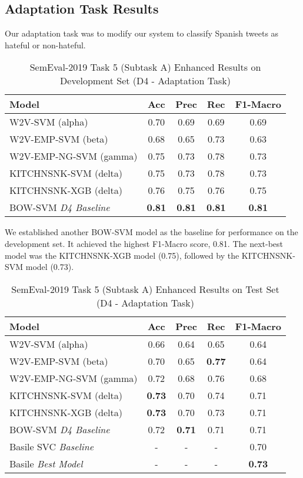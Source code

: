 \documentclass[11pt,a4paper]{article}
\begin{document}
\subsection{Adaptation Task Results}

Our adaptation task was to modify our system to classify Spanish tweets as hateful or non-hateful.


\begin{table}[hbt!]
\centering
\caption{SemEval-2019 Task 5 (Subtask A) Enhanced Results on Development Set (D4 - Adaptation Task)}
\label{tab:adaptationdevtest}
\scriptsize
\begin{tabular}{lcccc}
\hline
Model & Acc & Prec & Rec & F1-Macro \\ \hline
\textsc{W2V-SVM} (alpha) & 0.70 & 0.69 & 0.69 & 0.69  \\
\textsc{W2V-EMP-SVM} (beta) & 0.68 & 0.65 & 0.73 & 0.63 \\
\textsc{W2V-EMP-NG-SVM} (gamma) & 0.75 & 0.73 & 0.78 & 0.73 \\
\textsc{KITCHNSNK-SVM} (delta) & 0.75 & 0.73 & 0.78 & 0.73 \\
\textsc{KITCHNSNK-XGB} (delta) & 0.76 & 0.75 & 0.76 & 0.75 \\
\textsc{BOW-SVM} \textit{D4 Baseline} & \textbf{0.81} & \textbf{0.81} & \textbf{0.81} & \textbf{0.81} \\
\hline
\end{tabular}
\end{table}

We established another BOW-SVM model as the baseline for performance on the development set. It achieved the highest F1-Macro score, 0.81. The next-best model was the KITCHNSNK-XGB model (0.75), followed by the KITCHNSNK-SVM model (0.73). 


\begin{table}[hbt!]
\centering
\caption{SemEval-2019 Task 5 (Subtask A) Enhanced Results on Test Set (D4 - Adaptation Task)}
\label{tab:adaptationevaltest}
\scriptsize
\begin{tabular}{lcccc}
\hline
Model & Acc & Prec & Rec & F1-Macro \\ \hline
\textsc{W2V-SVM} (alpha) & 0.66 & 0.64 & 0.65 & 0.64  \\
\textsc{W2V-EMP-SVM} (beta) & 0.70 & 0.65 & \textbf{0.77} & 0.64 \\
\textsc{W2V-EMP-NG-SVM} (gamma) & 0.72 & 0.68 & 0.76 & 0.68 \\
\textsc{KITCHNSNK-SVM} (delta) & \textbf{0.73} & 0.70 & 0.74 & 0.71 \\
\textsc{KITCHNSNK-XGB} (delta) & \textbf{0.73} & 0.70 & 0.73 & 0.71 \\
\textsc{BOW-SVM} \textit{D4 Baseline} & 0.72 & \textbf{0.71} & 0.71 & 0.71 \\
Basile SVC \textit{Baseline} & - & - & - & 0.70 \\
Basile \textit{Best Model} & - & - & - & \textbf{0.73 }\\ \hline
\end{tabular}
\end{table}
\end{document}
